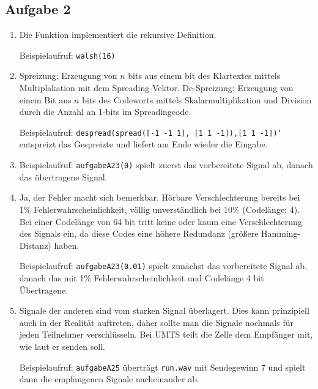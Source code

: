 \documentclass[a4paper,10pt]{scrartcl}
\begin{document}
\subsection*{Aufgabe 2}
\begin{enumerate}
  \item Die Funktion implementiert die rekursive Definition.

Beispielaufruf: \texttt{walsh(16)} 
  \item Spreizung: Erzeugung von \(n\) bits aus einem bit des Klartextes mittels Multiplakation mit dem Spreading-Vektor. De-Spreizung: Erzeugung von einem Bit aus \(n\) bits des Codeworts mittels Skalarmultiplikation und Division durch die Anzahl an 1-bits im Spreadingcode.

Beispielaufruf: \texttt{despread(spread([-1 -1 1], [1 1 -1]),[1 1 -1])'} entspreizt das Gespreizte und liefert am Ende wieder die Eingabe.

  \item Beispielaufruf: \texttt{aufgabeA23(0)} spielt zuerst das vorbereitete Signal ab, danach das übertragene Signal.
  \item 

Ja, der Fehler macht sich bemerkbar. Hörbare Verschlechterung bereits bei 1\% Fehlerwahrscheinlichkeit, völlig unverständlich bei 10\% (Codelänge: 4). Bei einer Codelänge von 64 bit tritt keine oder kaum eine Verschlechterung des Signals ein, da diese Codes eine höhere Redundanz (größere Hamming-Distanz) haben.

Beispielaufruf: \texttt{aufgabeA23(0.01)} spielt zunächst das vorbereitete Signal ab, danach das mit 1\% Fehlerwahrscheinlichkeit und Codelänge 4 bit Übertragene. 
 \item Signale der anderen sind vom starken Signal überlagert. Dies kann prinzipiell auch in der Realität auftreten, daher sollte man die Signale nochmals für jeden Teilnehmer verschlüsseln. Bei UMTS teilt die Zelle dem Empfänger mit, wie laut er senden soll.

Beispielaufruf: \texttt{aufgabeA25} überträgt \texttt{run.wav} mit Sendegewinn 7 und spielt dann die empfangenen Signale nacheinander ab.
\end{enumerate}
\end{document}
